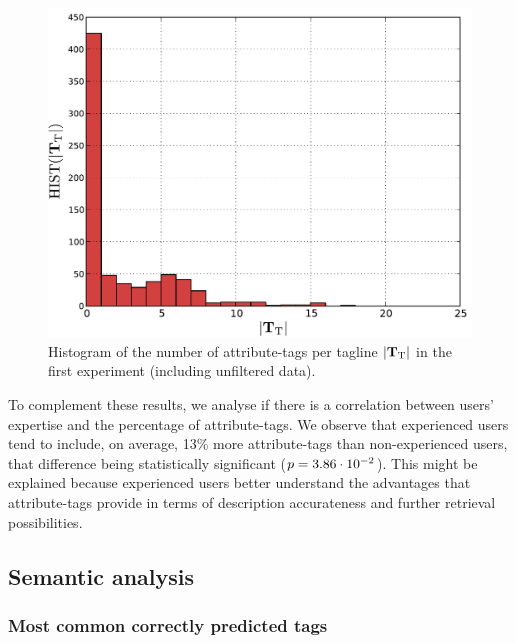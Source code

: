 \begin{figure}[t]
  \centering
  \includegraphics[width=\figSizeMidLarge]{ch06_ontology/pics/number_of_semantic_tags_histogram_no_filter}
  \caption[Histogram of the number of attribute-tags per tagline]{Histogram of the number of attribute-tags per tagline $|\mathbf{T}_{\text{T}}|$ in the first experiment (including unfiltered data).}
  \label{fig:ontology:percentage_of_attribute_tags}
\end{figure}

To complement these results, we analyse if there is a correlation between users' expertise and the percentage of attribute-tags. We observe that experienced users tend to include, on average, 13\% more attribute-tags than non-experienced users, that difference being statistically significant ($p = 3.86\cdot 10^{-2}$). This might be explained because experienced users better understand the advantages that attribute-tags provide in terms of description accurateness and further retrieval possibilities.


\subsection{Semantic analysis}

\subsubsection{Most common correctly predicted tags}

